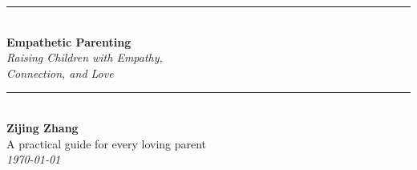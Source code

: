 \documentclass[12pt,openany]{book}
\begin{document}
\frontmatter

\begin{titlepage}
  \centering
  \vspace*{2cm}
  {\color{chaptercolor}\rule{\linewidth}{1.5pt}}\\[0.4cm]
  {\huge\bfseries Empathetic Parenting}\\[0.3cm]
  {\Large\itshape Raising Children with Empathy,\\[0.1cm]
   Connection, and Love}\\[0.4cm]
  {\color{chaptercolor}\rule{\linewidth}{1.5pt}}\\[2cm]
  {\Large \textbf{Zijing Zhang}}\\[2cm]
  \vfill
  {\large A practical guide for every loving parent}\\[1cm]
  {\small\itshape \today}
\end{titlepage}

\tableofcontents



\mainmatter











\backmatter






\end{document}
